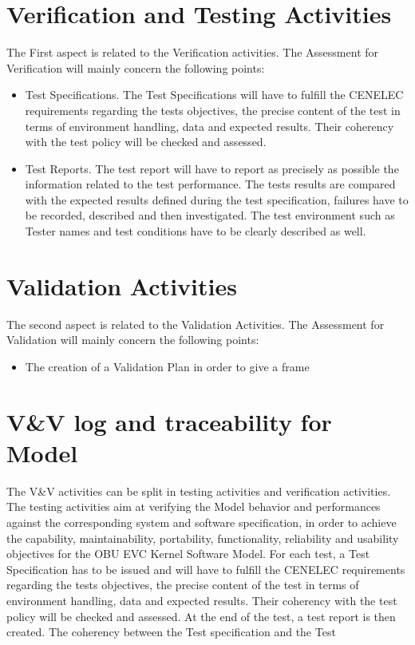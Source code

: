 \documentclass{template/openetcs_report}
\begin{document}
\section{Verification and Testing Activities}
The First aspect is related to the Verification activities. The Assessment for Verification will mainly concern the following points:
\begin{itemize}
\item Test Specifications. The Test Specifications will have to fulfill the CENELEC requirements regarding the tests objectives, the precise content of the test in terms of environment handling, data and expected results. Their coherency with the test policy will be checked and assessed.
\item  Test Reports. The test report will have to report as precisely as possible the information related to the test performance. The tests results are compared with the expected results defined during the test specification, failures have to be recorded, described and then investigated. The test environment such as Tester names and test conditions have to be clearly described as well.
\end{itemize}

\section{Validation Activities}
The second aspect is related to the Validation Activities. The Assessment for Validation will mainly concern the following points:
\begin{itemize}
\item The creation of a Validation Plan in order to give a frame
\end{itemize}

\section{V\&V log and traceability for Model}
The V\&V activities can be split in testing activities and verification activities. The testing activities aim at verifying the Model behavior and performances against the corresponding system and software specification, in order to achieve the capability, maintainability, portability, functionality, reliability and usability objectives for the OBU EVC Kernel Software Model. 
For each test, a Test Specification has to be issued and will have to fulfill the CENELEC requirements regarding the tests objectives, the precise content of the test in terms of environment handling, data and expected results. Their coherency with the test policy will be checked and assessed. At the end of the test, a test report is then created. The coherency between the Test specification and the Test
\end{document}
